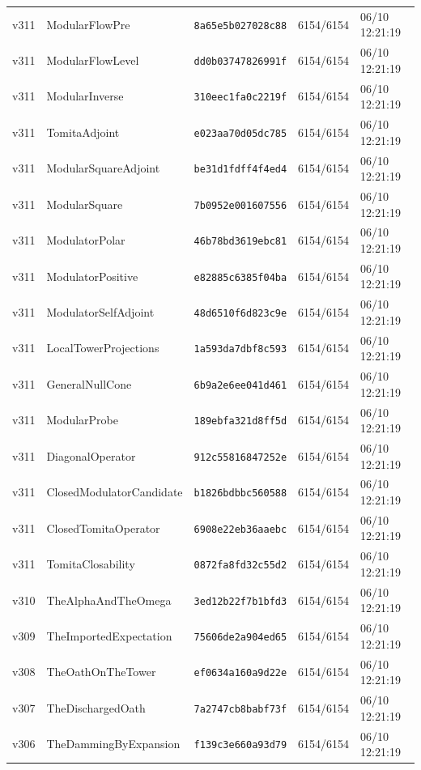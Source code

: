 \documentclass[11pt]{article}
\theoremstyle{definition}\newtheorem{deriv}{Derivation}
\begin{document}
{\begin{longtable}{@{}lllll@{}}
v311 & ModularFlowPre & \texttt{8a65e5b027028c88} & 6154/6154 & 06/10 12:21:19 \\
v311 & ModularFlowLevel & \texttt{dd0b03747826991f} & 6154/6154 & 06/10 12:21:19 \\
v311 & ModularInverse & \texttt{310eec1fa0c2219f} & 6154/6154 & 06/10 12:21:19 \\
v311 & TomitaAdjoint & \texttt{e023aa70d05dc785} & 6154/6154 & 06/10 12:21:19 \\
v311 & ModularSquareAdjoint & \texttt{be31d1fdff4f4ed4} & 6154/6154 & 06/10 12:21:19 \\
v311 & ModularSquare & \texttt{7b0952e001607556} & 6154/6154 & 06/10 12:21:19 \\
v311 & ModulatorPolar & \texttt{46b78bd3619ebc81} & 6154/6154 & 06/10 12:21:19 \\
v311 & ModulatorPositive & \texttt{e82885c6385f04ba} & 6154/6154 & 06/10 12:21:19 \\
v311 & ModulatorSelfAdjoint & \texttt{48d6510f6d823c9e} & 6154/6154 & 06/10 12:21:19 \\
v311 & LocalTowerProjections & \texttt{1a593da7dbf8c593} & 6154/6154 & 06/10 12:21:19 \\
v311 & GeneralNullCone & \texttt{6b9a2e6ee041d461} & 6154/6154 & 06/10 12:21:19 \\
v311 & ModularProbe & \texttt{189ebfa321d8ff5d} & 6154/6154 & 06/10 12:21:19 \\
v311 & DiagonalOperator & \texttt{912c55816847252e} & 6154/6154 & 06/10 12:21:19 \\
v311 & ClosedModulatorCandidate & \texttt{b1826bdbbc560588} & 6154/6154 & 06/10 12:21:19 \\
v311 & ClosedTomitaOperator & \texttt{6908e22eb36aaebc} & 6154/6154 & 06/10 12:21:19 \\
v311 & TomitaClosability & \texttt{0872fa8fd32c55d2} & 6154/6154 & 06/10 12:21:19 \\
v310 & TheAlphaAndTheOmega & \texttt{3ed12b22f7b1bfd3} & 6154/6154 & 06/10 12:21:19 \\
v309 & TheImportedExpectation & \texttt{75606de2a904ed65} & 6154/6154 & 06/10 12:21:19 \\
v308 & TheOathOnTheTower & \texttt{ef0634a160a9d22e} & 6154/6154 & 06/10 12:21:19 \\
v307 & TheDischargedOath & \texttt{7a2747cb8babf73f} & 6154/6154 & 06/10 12:21:19 \\
v306 & TheDammingByExpansion & \texttt{f139c3e660a93d79} & 6154/6154 & 06/10 12:21:19 \\

\end{longtable}}
\end{document}
